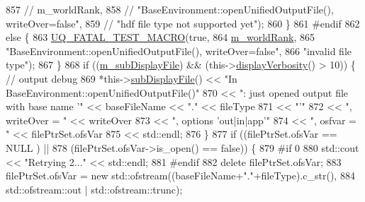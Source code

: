 \begin{DoxyCode}
857           \textcolor{comment}{//                    m\_worldRank,}
858           \textcolor{comment}{//                    "BaseEnvironment::openUnifiedOutputFile(), writeOver=false",}
859           \textcolor{comment}{//                    "hdf file type not supported yet");}
860         \}
861 \textcolor{preprocessor}{#endif}
862 \textcolor{preprocessor}{}        \textcolor{keywordflow}{else} \{
863           \hyperlink{_defines_8h_a56d63d18d0a6d45757de47fcc06f574d}{UQ\_FATAL\_TEST\_MACRO}(\textcolor{keyword}{true},
864                               \hyperlink{class_q_u_e_s_o_1_1_base_environment_a464cab923ada0e14c6e3a4000c2ea385}{m\_worldRank},
865                               \textcolor{stringliteral}{"BaseEnvironment::openUnifiedOutputFile(), writeOver=false"},
866                               \textcolor{stringliteral}{"invalid file type"});
867         \}
868         \textcolor{keywordflow}{if} ((\hyperlink{class_q_u_e_s_o_1_1_base_environment_a52b4275aa8ee85994dd304d9fe95c9c5}{m\_subDisplayFile}) && (this->\hyperlink{class_q_u_e_s_o_1_1_base_environment_a1fe5f244fc0316a0ab3e37463f108b96}{displayVerbosity}() > 10)) \{ \textcolor{comment}{//
       output debug}
869           *this->\hyperlink{class_q_u_e_s_o_1_1_base_environment_a8a0064746ae8dddfece4229b9ad374d6}{subDisplayFile}() << \textcolor{stringliteral}{"In BaseEnvironment::openUnifiedOutputFile()"}
870                                   << \textcolor{stringliteral}{": just opened output file with base name '"} << baseFileName << \textcolor{stringliteral}{"."} <<
       fileType
871                                   << \textcolor{stringliteral}{"'"}
872                                   << \textcolor{stringliteral}{", writeOver = "} << writeOver
873                                   << \textcolor{stringliteral}{", options 'out|in|app'"}
874                                   << \textcolor{stringliteral}{", osfvar = "} << filePtrSet.ofsVar
875                                   << std::endl;
876         \}
877         \textcolor{keywordflow}{if} ((filePtrSet.ofsVar            == NULL ) ||
878             (filePtrSet.ofsVar->is\_open() == \textcolor{keyword}{false})) \{
879 \textcolor{preprocessor}{#if 0}
880 \textcolor{preprocessor}{}          std::cout << \textcolor{stringliteral}{"Retrying 2..."} << std::endl;
881 \textcolor{preprocessor}{#endif}
882 \textcolor{preprocessor}{}          \textcolor{keyword}{delete} filePtrSet.ofsVar;
883           filePtrSet.ofsVar = \textcolor{keyword}{new} std::ofstream((baseFileName+\textcolor{stringliteral}{"."}+fileType).c\_str(),
884                                                 std::ofstream::out | std::ofstream::trunc);

\end{DoxyCode}
